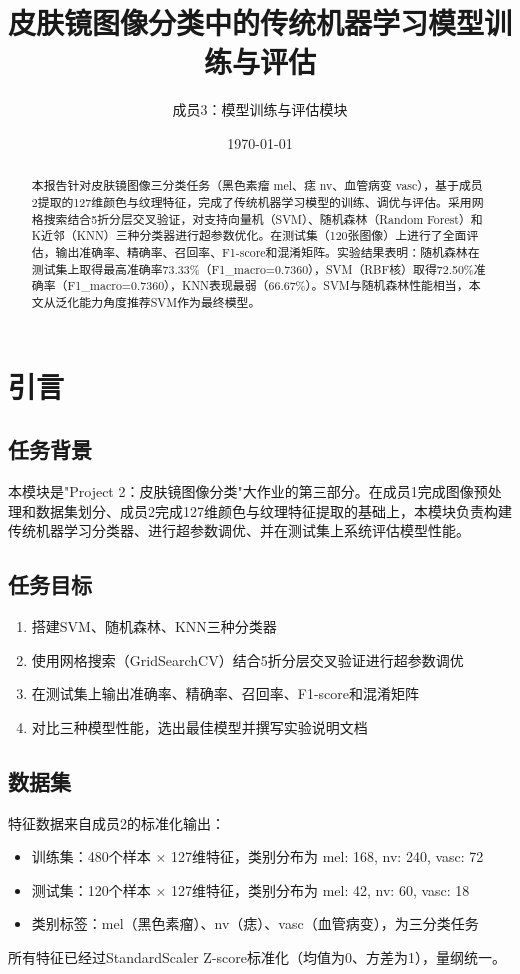 \documentclass[12pt,a4paper]{ctexart}
\title{\textbf{皮肤镜图像分类中的传统机器学习模型训练与评估}}
\author{成员3：模型训练与评估模块}
\date{\today}
\begin{document}
\maketitle

\begin{abstract}
本报告针对皮肤镜图像三分类任务（黑色素瘤 mel、痣 nv、血管病变 vasc），基于成员2提取的127维颜色与纹理特征，完成了传统机器学习模型的训练、调优与评估。采用网格搜索结合5折分层交叉验证，对支持向量机（SVM）、随机森林（Random Forest）和K近邻（KNN）三种分类器进行超参数优化。在测试集（120张图像）上进行了全面评估，输出准确率、精确率、召回率、F1-score和混淆矩阵。实验结果表明：随机森林在测试集上取得最高准确率73.33\%（F1\_macro=0.7360），SVM（RBF核）取得72.50\%准确率（F1\_macro=0.7360），KNN表现最弱（66.67\%）。SVM与随机森林性能相当，本文从泛化能力角度推荐SVM作为最终模型。
\end{abstract}

\section{引言}

\subsection{任务背景}
本模块是"Project 2：皮肤镜图像分类"大作业的第三部分。在成员1完成图像预处理和数据集划分、成员2完成127维颜色与纹理特征提取的基础上，本模块负责构建传统机器学习分类器、进行超参数调优、并在测试集上系统评估模型性能。

\subsection{任务目标}
\begin{enumerate}[label=(\arabic*)]
    \item 搭建SVM、随机森林、KNN三种分类器
    \item 使用网格搜索（GridSearchCV）结合5折分层交叉验证进行超参数调优
    \item 在测试集上输出准确率、精确率、召回率、F1-score和混淆矩阵
    \item 对比三种模型性能，选出最佳模型并撰写实验说明文档
\end{enumerate}

\subsection{数据集}
特征数据来自成员2的标准化输出：
\begin{itemize}
    \item 训练集：480个样本 $\times$ 127维特征，类别分布为 mel: 168, nv: 240, vasc: 72
    \item 测试集：120个样本 $\times$ 127维特征，类别分布为 mel: 42, nv: 60, vasc: 18
    \item 类别标签：mel（黑色素瘤）、nv（痣）、vasc（血管病变），为三分类任务
\end{itemize}
所有特征已经过StandardScaler Z-score标准化（均值为0、方差为1），量纲统一。
\end{document}
